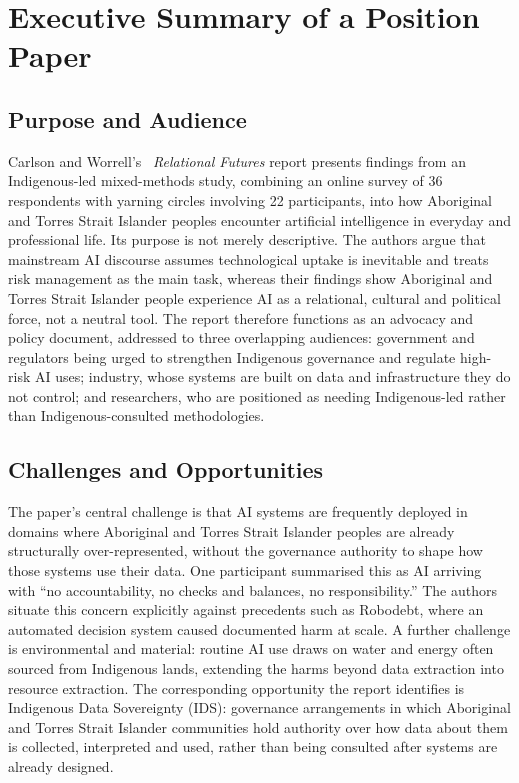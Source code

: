 \section{Executive Summary of a Position Paper}
\label{sec:Executive Summary}

\subsection{Purpose and Audience}

Carlson and Worrell's~\cite{carlson2026relational} \emph{Relational Futures} report presents
findings from an Indigenous-led mixed-methods study, combining an online survey of 36 respondents
with yarning circles involving 22 participants, into how Aboriginal and Torres Strait Islander
peoples encounter artificial intelligence in everyday and professional life. Its purpose is not
merely descriptive. The authors argue that mainstream AI discourse assumes technological uptake is
inevitable and treats risk management as the main task, whereas their findings show Aboriginal and
Torres Strait Islander people experience AI as a relational, cultural and political force, not a
neutral tool. The report therefore functions as an advocacy and policy document, addressed to
three overlapping audiences: government and regulators being urged to strengthen Indigenous
governance and regulate high-risk AI uses; industry, whose systems are built on data and
infrastructure they do not control; and researchers, who are positioned as needing Indigenous-led
rather than Indigenous-consulted methodologies.

\subsection{Challenges and Opportunities}

The paper's central challenge is that AI systems are frequently deployed in domains where
Aboriginal and Torres Strait Islander peoples are already structurally over-represented, without
the governance authority to shape how those systems use their data. One participant summarised
this as AI arriving with ``no accountability, no checks and balances, no responsibility.'' The
authors situate this concern explicitly against precedents such as Robodebt, where an automated
decision system caused documented harm at scale. A further challenge is environmental and
material: routine AI use draws on water and energy often sourced from Indigenous lands, extending
the harms beyond data extraction into resource extraction. The corresponding opportunity the
report identifies is Indigenous Data Sovereignty (IDS): governance arrangements in which Aboriginal
and Torres Strait Islander communities hold authority over how data about them is collected,
interpreted and used, rather than being consulted after systems are already designed.

